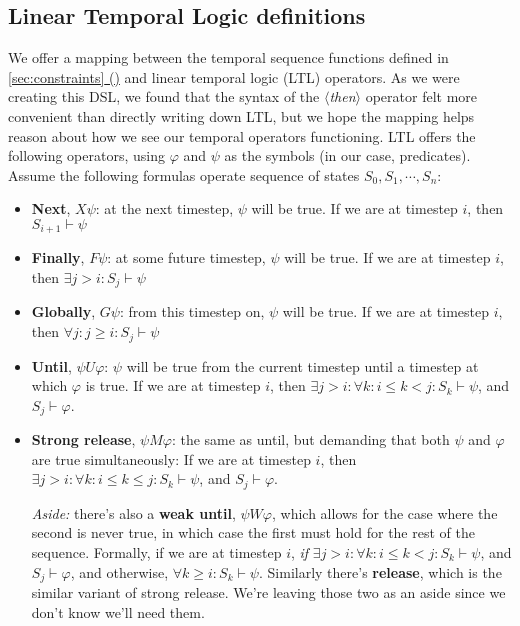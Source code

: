\documentclass{article}
\newcommand{\dsl}[1]{{\it $\langle$#1$\rangle$}}
\newcommand*{\fullref}[1]{\hyperref[{#1}]{\autoref*{#1} (\nameref*{#1})}} %
\begin{document}
\subsection{Linear Temporal Logic definitions}
We offer a mapping between the temporal sequence functions defined in \fullref{sec:constraints} and linear temporal logic (LTL) operators.
As we were creating this DSL, we found that the syntax of the \dsl{then} operator felt more convenient than directly writing down LTL, but we hope the mapping helps reason about how we see our temporal operators functioning.
LTL offers the following operators, using $\varphi$ and $\psi$ as the symbols (in our case, predicates).
Assume the following formulas operate sequence of states $S_0, S_1, \cdots, S_n$:
\begin{itemize}
    \item \textbf{Next}, $X \psi$: at the next timestep, $\psi$ will be true. If we are at timestep $i$, then $S_{i+1} \vdash \psi$

    \item \textbf{Finally}, $F \psi$: at some future timestep, $\psi$ will be true. If we are at timestep $i$, then $\exists j > i:  S_{j} \vdash \psi$

    \item \textbf{Globally}, $G \psi$: from this timestep on, $\psi$ will be true. If we are at timestep $i$, then $\forall j: j \geq i: S_{j} \vdash \psi$

    \item \textbf{Until}, $\psi U \varphi$: $\psi$ will be true from the current timestep until a timestep at which $\varphi$ is true. If we are at timestep $i$, then $\exists j > i: \forall k: i \leq k < j: S_k \vdash \psi$, and $S_j \vdash \varphi$.
    \item \textbf{Strong release}, $\psi M \varphi$: the same as until, but demanding that both $\psi$ and $\varphi$ are true simultaneously: If we are at timestep $i$, then $\exists j > i: \forall k: i \leq k \leq j: S_k \vdash \psi$, and $S_j \vdash \varphi$.

    \textit{Aside:} there's also a \textbf{weak until}, $\psi W \varphi$, which allows for the case where the second is never true, in which case the first must hold for the rest of the sequence. Formally, if we are at timestep $i$, \textit{if} $\exists j > i: \forall k: i \leq k < j: S_k \vdash \psi$, and $S_j \vdash \varphi$, and otherwise, $\forall k \geq i: S_k \vdash \psi$. Similarly there's \textbf{release}, which is the similar variant of strong release. We're leaving those two as an aside since we don't know we'll need them.

\end{itemize}
\end{document}
